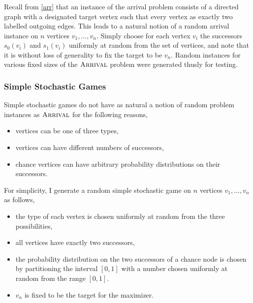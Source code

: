 \subsubsection{\arr} \label{arrRandom}
Recall from \cref{arr} that an instance of the arrival problem consists of a directed graph with
a designated target vertex such that every vertex as exactly two labelled outgoing edges.
This leads to a natural notion of a random arrival instance on $n$ vertices $v_1, ..., v_n$.
Simply choose for each vertex $v_i$ the successors $s_0(v_i)$ and $s_1(v_i)$ uniformly at random
from the set of vertices, and note that it is without loss of generality to fix the target to be $v_n$.
Random instances for various fixed sizes of the $\textsc{Arrival}$ problem were generated thusly for testing.

\subsubsection{Simple Stochastic Games} \label{ssgRandom}
Simple stochastic games do not have as natural a notion of random problem instances as $\textsc{Arrival}$ for the following reasons,
\begin{itemize}
  \item vertices can be one of three types, 
  \item vertices can have different numbers of successors,
  \item chance vertices can have arbitrary probability distributions on their successors.
\end{itemize}
For simplicity, I generate a random simple stochastic game on $n$ vertices $v_1, ..., v_n$ as follows,
\begin{itemize}
  \item the type of each vertex is chosen uniformly at random from the three possibilities,
  \item all vertices have exactly two successors,
  \item the probability distribution on the two successors of a chance node is chosen by
    partitioning the interval $[0, 1]$ with a number chosen uniformly at random from the range $[0, 1]$.
  \item $v_n$ is fixed to be the target for the maximizer.
\end{itemize}

